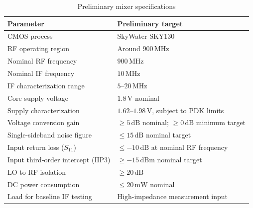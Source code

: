 \documentclass[11pt,letterpaper]{article}
\begin{document}
\begin{table}[htbp]
\centering
\caption{Preliminary mixer specifications}
\label{tab:specifications}
\begin{tabularx}{\textwidth}{@{}p{}Y@{}}
\toprule
\textbf{Parameter} & \textbf{Preliminary target} \\
\midrule

CMOS process &
SkyWater SKY130 \\

RF operating region &
Around \(900\,\mathrm{MHz}\) \\

Nominal RF frequency &
\(900\,\mathrm{MHz}\) \\

Nominal IF frequency &
\(10\,\mathrm{MHz}\) \\

IF characterization range &
\(5\)--\(20\,\mathrm{MHz}\) \\

Core supply voltage &
\(1.8\,\mathrm{V}\) nominal \\

Supply characterization &
\(1.62\)--\(1.98\,\mathrm{V}\),
subject to PDK limits \\

Voltage conversion gain &
\(\geq 5\,\mathrm{dB}\) nominal;
\(\geq 0\,\mathrm{dB}\) minimum target \\

Single-sideband noise figure &
\(\leq 15\,\mathrm{dB}\) nominal target \\

Input return loss (\(S_{11}\)) &
\(\leq -10\,\mathrm{dB}\)
at nominal RF frequency \\

Input third-order intercept (\(\mathrm{IIP3}\)) &
\(\geq -15\,\mathrm{dBm}\) nominal target \\

LO-to-RF isolation &
\(\geq 20\,\mathrm{dB}\) \\

DC power consumption &
\(\leq 20\,\mathrm{mW}\) nominal \\

Load for baseline IF testing &
High-impedance measurement input \\

\bottomrule
\end{tabularx}
\end{table}
\end{document}
